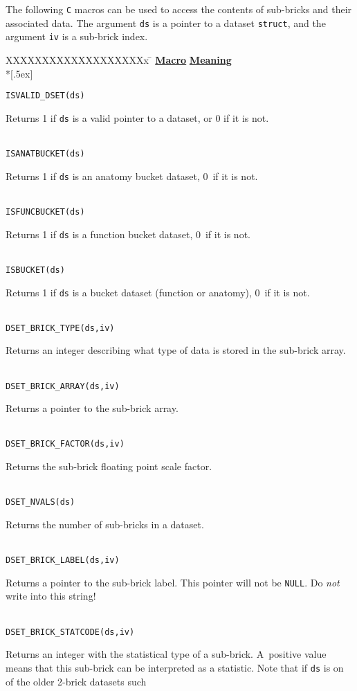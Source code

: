 The following {\tt C} macros can be used to access the contents
of sub-bricks and their associated data.
The argument {\tt ds} is a pointer to a dataset {\tt struct},
and the argument {\tt iv} is a sub-brick index.
\vset
\renewcommand{\tb}[1]{\parbox[t]{3.99in}{\sloppy #1}}
\begin{tabbing}
  XXXXXXXXXXXXXXXXXXXx \= \kill
%
\underline{\bf Macro} \> \underline{\bf Meaning} \\*[.5ex]

{\tt ISVALID\_DSET(ds)} \> \tb{Returns 1 if {\tt ds} is a valid pointer
                              to a dataset, or 0 if it is not.}
\\[.9ex]
{\tt ISANATBUCKET(ds)} \> \tb{Returns 1 if {\tt ds} is an anatomy
                              bucket dataset, 0~if it is not.}
\\[.9ex]
{\tt ISFUNCBUCKET(ds)} \> \tb{Returns 1 if {\tt ds} is a function
                              bucket dataset, 0~if it is not.}
\\[.9ex]
{\tt ISBUCKET(ds)}     \> \tb{Returns 1 if {\tt ds} is a
                              bucket dataset (function or anatomy), 0~if it is not.}
\\[.9ex]
{\tt DSET\_BRICK\_TYPE(ds,iv)} \> \tb{Returns an integer describing what type
                                    of data is stored in the sub-brick array.}
\\[.9ex]
{\tt DSET\_BRICK\_ARRAY(ds,iv)} \> \tb{Returns a pointer to the sub-brick array.}
\\[.9ex]
{\tt DSET\_BRICK\_FACTOR(ds,iv)} \> \tb{Returns the sub-brick floating point
                                      scale factor.}
\\[.9ex]
{\tt DSET\_NVALS(ds)} \> \tb{Returns the number of sub-bricks in a dataset.}
\\[.9ex]
{\tt DSET\_BRICK\_LABEL(ds,iv)} \> \tb{Returns a pointer to the sub-brick label.
                                     This pointer will not be {\tt NULL}.  Do {\it not\/}
                                     write into this string!}
\\[.9ex]
{\tt DSET\_BRICK\_STATCODE(ds,iv)} \> \tb{Returns an integer with the statistical
                                        type of a sub-brick.  A~positive value
                                        means that this sub-brick can be interpreted
                                        as a statistic.  Note that if {\tt ds} is
                                        on of the older 2-brick datasets such
}
\end{tabbing}
